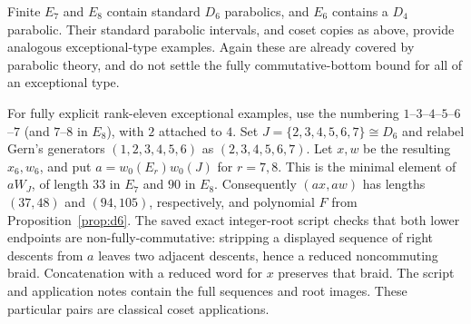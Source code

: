 \documentclass[11pt]{article}
\theoremstyle{definition}\newtheorem{definition}[theorem]{Definition}
\theoremstyle{remark}\newtheorem{remark}[theorem]{Remark}
\begin{document}
Finite $E_7$ and $E_8$ contain standard $D_6$ parabolics, and $E_6$
contains a $D_4$ parabolic. Their standard parabolic intervals, and
coset copies as above, provide analogous exceptional-type examples.
Again these are already covered by parabolic theory, and do not
settle the fully commutative-bottom bound for all of an exceptional type.

For fully explicit rank-eleven exceptional examples, use the numbering
$1$--$3$--$4$--$5$--$6$--$7$ (and $7$--$8$ in $E_8$), with
$2$ attached to $4$. Set $J=\{2,3,4,5,6,7\}\cong D_6$ and relabel
Gern's generators $(1,2,3,4,5,6)$ as $(2,3,4,5,6,7)$.
Let $x,w$ be the resulting $x_6,w_6$, and put
$a=w_0(E_r)w_0(J)$ for $r=7,8$. This is the minimal element of
$aW_J$, of length $33$ in $E_7$ and $90$ in $E_8$.
Consequently $(ax,aw)$ has lengths $(37,48)$ and $(94,105)$,
respectively, and polynomial $F$ from Proposition~\ref{prop:d6}.
The saved exact integer-root script checks that both lower endpoints
are non-fully-commutative: stripping a displayed sequence of right
descents from $a$ leaves two adjacent descents, hence a reduced
noncommuting braid. Concatenation with a reduced word for $x$ preserves
that braid. The script and application notes contain the full sequences
and root images. These particular pairs are classical coset applications.
\end{document}
